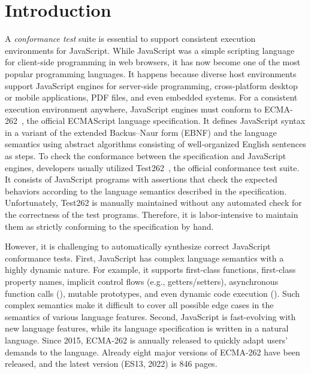 \section{Introduction}\label{sec:intro}

A \textit{conformance test} suite is essential to support consistent execution
environments for JavaScript.
%
While JavaScript was a simple scripting language for client-side programming in
web browsers, it has now become one of the most popular programming languages.
%
It happens because diverse host environments support JavaScript engines for
server-side programming, cross-platform desktop or mobile applications, PDF
files, and even embedded systems.
%
For a consistent execution environment anywhere, JavaScript engines must conform
to ECMA-262~\cite{es13}, the official ECMAScript language specification.
%
It defines JavaScript syntax in a variant of the extended Backus–Naur form
(EBNF) and the language semantics using abstract algorithms consisting of
well-organized English sentences as steps.
%
To check the conformance between the specification and JavaScript engines,
developers usually utilized Test262~\cite{test262}, the official conformance
test suite.
%
It consists of JavaScript programs with assertions that check the expected
behaviors according to the language semantics described in the specification.
%
Unfortunately, Test262 is manually maintained without any automated check for
the correctness of the test programs.
%
Therefore, it is labor-intensive to maintain them as strictly conforming to the
specification by hand.


However, it is challenging to automatically synthesize correct JavaScript
conformance tests.
%
First, JavaScript has complex language semantics with a highly dynamic nature.
%
For example, it supports first-class functions, first-class property names,
implicit control flows (e.g., getters/setters), asynchronous function calls
(), mutable prototypes, and even dynamic code execution
().
%
Such complex semantics make it difficult to cover all possible edge cases in the
semantics of various language features.
%
Second, JavaScript is fast-evolving with new language features, while its
language specification is written in a natural language.
%
Since 2015, ECMA-262 is annually released to quickly adapt users' demands to the
language.
%
Already eight major versions of ECMA-262 have been released, and the
latest version (ES13, 2022) is 846 pages.

